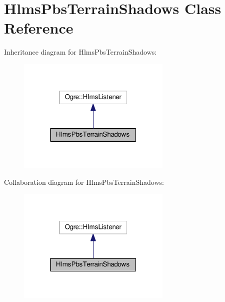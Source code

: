 \hypertarget{class_hlms_pbs_terrain_shadows}{}\section{Hlms\+Pbs\+Terrain\+Shadows Class Reference}
\label{class_hlms_pbs_terrain_shadows}


Inheritance diagram for Hlms\+Pbs\+Terrain\+Shadows\+:\nopagebreak
\begin{figure}[H]
\begin{center}
\leavevmode
\includegraphics[width=208pt]{class_hlms_pbs_terrain_shadows__inherit__graph}
\end{center}
\end{figure}


Collaboration diagram for Hlms\+Pbs\+Terrain\+Shadows\+:\nopagebreak
\begin{figure}[H]
\begin{center}
\leavevmode
\includegraphics[width=208pt]{class_hlms_pbs_terrain_shadows__coll__graph}
\end{center}
\end{figure}
